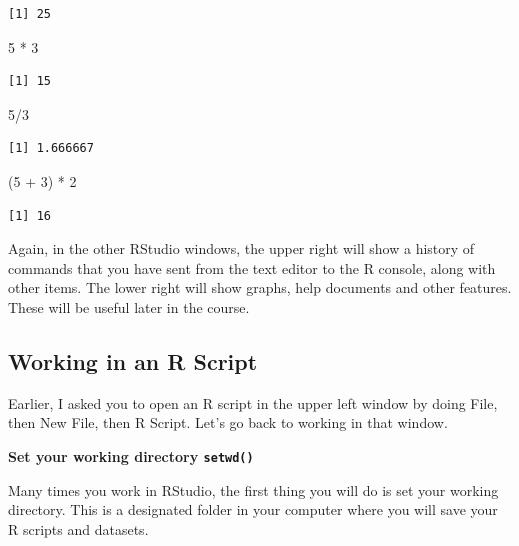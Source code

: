\documentclass[
  letterpaper,
  DIV=11,
  numbers=noendperiod]{scrreprt}
\newenvironment{Shaded}{\begin{snugshade}}{\end{snugshade}}
\newcommand{\DecValTok}[1]{\textcolor[rgb]{0.68,0.00,0.00}{#1}}
\newcommand{\NormalTok}[1]{\textcolor[rgb]{0.00,0.23,0.31}{#1}}
\newcommand{\SpecialCharTok}[1]{\textcolor[rgb]{0.37,0.37,0.37}{#1}}
\begin{document}
\begin{verbatim}
[1] 25
\end{verbatim}

\begin{Shaded}
\begin{Highlighting}[]
\DecValTok{5} \SpecialCharTok{*} \DecValTok{3}
\end{Highlighting}
\end{Shaded}

\begin{verbatim}
[1] 15
\end{verbatim}

\begin{Shaded}
\begin{Highlighting}[]
\DecValTok{5}\SpecialCharTok{/}\DecValTok{3}
\end{Highlighting}
\end{Shaded}

\begin{verbatim}
[1] 1.666667
\end{verbatim}

\begin{Shaded}
\begin{Highlighting}[]
\NormalTok{(}\DecValTok{5} \SpecialCharTok{+} \DecValTok{3}\NormalTok{) }\SpecialCharTok{*} \DecValTok{2}
\end{Highlighting}
\end{Shaded}

\begin{verbatim}
[1] 16
\end{verbatim}

Again, in the other RStudio windows, the upper right will show a history
of commands that you have sent from the text editor to the R console,
along with other items. The lower right will show graphs, help documents
and other features. These will be useful later in the course.

\hypertarget{working-in-an-r-script}{%
\subsection{Working in an R Script}\label{working-in-an-r-script}}

Earlier, I asked you to open an R script in the upper left window by
doing File, then New File, then R Script. Let's go back to working in
that window.

\textbf{Set your working directory \texttt{setwd()}}

Many times you work in RStudio, the first thing you will do is set your
working directory. This is a designated folder in your computer where
you will save your R scripts and datasets.
\end{document}
